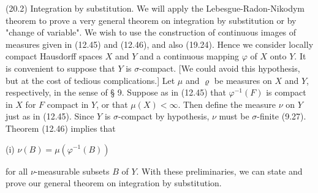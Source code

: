 (20.2) Integration by substitution. We will apply the Lebesgue-Radon-Nikodym theorem to prove a very general theorem on integration by substitution or by "change of variable". We wish to use the construction of continuous images of measures given in (12.45) and (12.46), and also (19.24). Hence we consider locally compact Hausdorff spaces $X$ and $Y$ and a continuous mapping $\varphi$ of $X$ onto $Y$. It is convenient to suppose that $Y$ is $\sigma$-compact. [We could avoid this hypothesis, but at the cost of tedious complications.] Let $\mu$ and $\varrho$ be measures on $X$ and $Y$, respectively, in the sense of § 9. Suppose as in (12.45) that $\varphi^{-1}(F)$ is compact in $X$ for $F$ compact in $Y$, or that $\mu(X) < \infty$. Then define the measure $\nu$ on $Y$ just as in (12.45). Since $Y$ is $\sigma$-compact by hypothesis, $\nu$ must be $\sigma$-finite (9.27). Theorem (12.46) implies that

(i) $\nu(B) = \mu(\varphi^{-1}(B))$

for all $\nu$-measurable subsets $B$ of $Y$. With these preliminaries, we can state and prove our general theorem on integration by substitution.